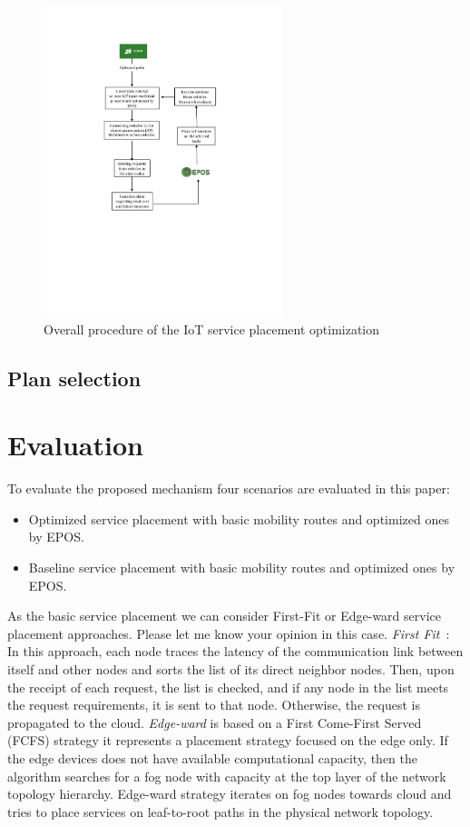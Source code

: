 \documentclass[twocolumn]{article}
\begin{document}
\begin{figure}[!htbp]
\centering
\includegraphics[clip, trim=4.5cm 9.6cm 5.6cm 3.5cm, width=\columnwidth, height=9cm]{figures/pdf/Workflow.pdf}
\caption{Overall procedure of the IoT service placement optimization}
\label{fig:workflow}
\end{figure}

\subsection{Plan selection}

\section{Evaluation}
\par To evaluate the proposed mechanism four scenarios are evaluated in this paper: 
\begin{itemize}[noitemsep, topsep=4pt]
\item Optimized service placement with basic mobility routes and optimized ones by EPOS.
\item Baseline service placement with basic mobility routes and optimized ones by EPOS.
\end{itemize}

As the basic service placement we can consider First-Fit\cite{brent1989efficient,skarlat2017} or Edge-ward\cite{gupta2017ifogsim} service placement approaches. Please let me know your opinion in this case.
\emph{First Fit}~\cite{brent1989efficient,skarlat2017}: In this approach, each node traces the latency of the communication link between itself and other nodes and sorts the list of its direct neighbor nodes. Then, upon the receipt of each request, the list is checked, and if any node in the list meets the request requirements, it is sent to that node. Otherwise, the request is propagated to the cloud.
\emph{Edge-ward}\cite{gupta2017ifogsim} is based on a First Come-First Served (FCFS) strategy it represents a placement strategy focused on the edge only.  If the edge devices does not have available computational capacity, then the algorithm searches for a fog node with capacity at the top layer of the network topology hierarchy. Edge-ward strategy iterates on fog nodes towards cloud and tries to place services on leaf-to-root paths in the physical network topology.
\end{document}
